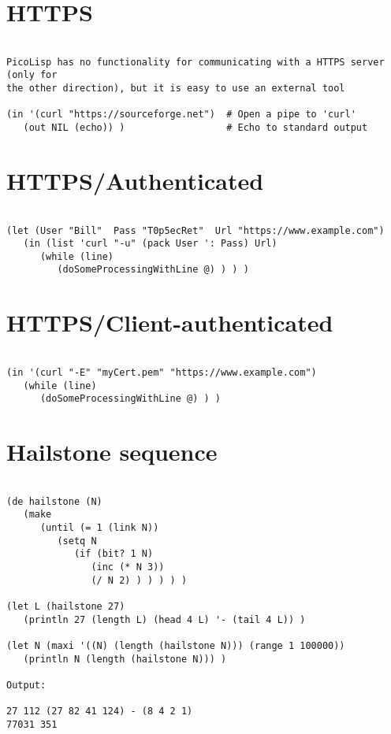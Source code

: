 \section*{HTTPS}

\begin{verbatim}

PicoLisp has no functionality for communicating with a HTTPS server (only for
the other direction), but it is easy to use an external tool

(in '(curl "https://sourceforge.net")  # Open a pipe to 'curl'
   (out NIL (echo)) )                  # Echo to standard output

\end{verbatim}

\section*{HTTPS/Authenticated}

\begin{verbatim}

(let (User "Bill"  Pass "T0p5ecRet"  Url "https://www.example.com")
   (in (list 'curl "-u" (pack User ': Pass) Url)
      (while (line)
         (doSomeProcessingWithLine @) ) ) )

\end{verbatim}

\section*{HTTPS/Client-authenticated}

\begin{verbatim}

(in '(curl "-E" "myCert.pem" "https://www.example.com")
   (while (line)
      (doSomeProcessingWithLine @) ) )

\end{verbatim}

\section*{Hailstone sequence}

\begin{verbatim}

(de hailstone (N)
   (make
      (until (= 1 (link N))
         (setq N
            (if (bit? 1 N)
               (inc (* N 3))
               (/ N 2) ) ) ) ) )

(let L (hailstone 27)
   (println 27 (length L) (head 4 L) '- (tail 4 L)) )

(let N (maxi '((N) (length (hailstone N))) (range 1 100000))
   (println N (length (hailstone N))) )

Output:

27 112 (27 82 41 124) - (8 4 2 1)
77031 351

\end{verbatim}

